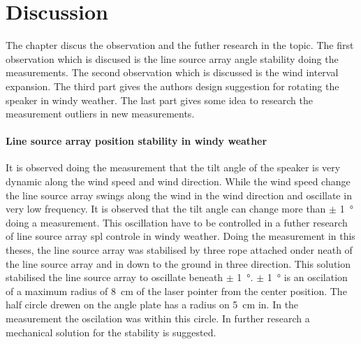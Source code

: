\section{Discussion}\label{sec:discussion}
The chapter discus the observation and the futher research in the topic. The first observation which is discused is the line source array angle stability doing the measurements. The second observation which is discussed is the wind interval expansion. The third part gives the authors design suggestion for rotating the speaker in windy weather. The last part gives some idea to research the measurement outliers in new measurements.


\paragraph{Line source array position stability in windy weather} 
It is observed doing the measurement that the tilt angle of the speaker is very dynamic along the wind speed and wind direction. While the wind speed change the line source array swings along the wind in the wind direction and oscillate in very low frequency. It is observed that the tilt angle can change more than $\pm$ \SI{1}{\degree} doing a measurement. This oscillation have to be controlled in a futher research of line source array \gls{spl} controle in windy weather. Doing the measurement in this theses, the line source array was stabilised by three rope attached onder neath of the line source array and in down to the ground in three direction. This solution stabilised the line source array to oscillate beneath  $\pm$ \SI{1}{\degree}. $\pm$ \SI{1}{\degree} is an oscilation of a maximum radius of \SI{8}{\centi\meter} of the laser pointer from the center position. The half circle drewen on the angle plate has a radius on \SI{5}{\centi\meter} in. In the measurement the oscilation was within this circle. In further research a mechanical solution for the stability is suggested.


